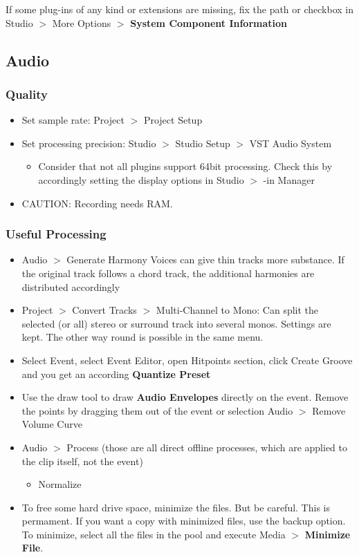 \documentclass[10pt]{article}
\begin{document}
If some plug-ins of any kind or extensions are missing, fix the path or checkbox in Studio $>$ More Options $>$ \textbf{System Component Information}

\subsection{Audio}\label{AudioQuality}

\subsubsection{Quality}

\begin{itemize}
	\item Set sample rate: Project $>$ Project Setup
	\item Set processing precision: Studio $>$ Studio Setup $>$ VST Audio System
	\begin{itemize}
		\item Consider that not all plugins support 64bit processing. Check this by accordingly setting the display options in Studio $>$ -in Manager
	\end{itemize}
	\item CAUTION: Recording needs RAM. 
\end{itemize}

\subsubsection{Useful Processing}

\begin{itemize}
	\item Audio $>$ Generate Harmony Voices can give thin tracks more substance. If the original track follows a chord track, the additional harmonies are distributed accordingly
	\item Project $>$ Convert Tracks $>$ Multi-Channel to Mono: Can split the selected (or all) stereo or surround track into several monos. Settings are kept. The other way round is possible in the same menu.
	\item Select Event, select Event Editor, open Hitpoints section, click Create Groove and you get an according \textbf{Quantize Preset}
	\item Use the draw tool to draw \textbf{Audio Envelopes} directly on the event. Remove the points by dragging them out of the event or selection Audio $>$ Remove Volume Curve
	\item Audio $>$ Process (those are all direct offline processes, which are applied to the clip itself, not the event)
	\begin{itemize}
		\item Normalize
	\end{itemize}
	\item To free some hard drive space, minimize the files. But be careful. This is permament. If you want a copy with minimized files, use the backup option. To minimize, select all the files in the pool and execute Media $>$ \textbf{Minimize File}.
\end{itemize}
\end{document}
